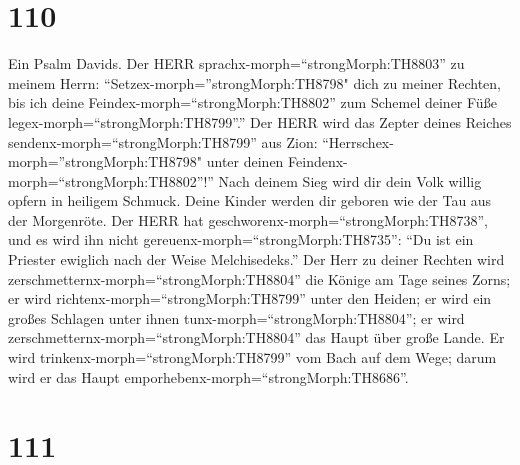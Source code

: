\hypertarget{section-109}{%
\section{110}\label{section-109}}

 Ein Psalm Davids. Der HERR
sprachx-morph=``strongMorph:TH8803'' zu meinem Herrn:
``Setzex-morph=''strongMorph:TH8798" dich zu meiner Rechten, bis ich
deine Feindex-morph=``strongMorph:TH8802'' zum Schemel deiner Füße
legex-morph=``strongMorph:TH8799''.''  Der HERR wird das
Zepter deines Reiches sendenx-morph=``strongMorph:TH8799'' aus Zion:
``Herrschex-morph=''strongMorph:TH8798" unter deinen
Feindenx-morph=``strongMorph:TH8802''!''  Nach deinem Sieg
wird dir dein Volk willig opfern in heiligem Schmuck. Deine Kinder
werden dir geboren wie der Tau aus der Morgenröte.  Der HERR
hat geschworenx-morph=``strongMorph:TH8738'', und es wird ihn nicht
gereuenx-morph=``strongMorph:TH8735'': ``Du ist ein Priester ewiglich
nach der Weise Melchisedeks.''  Der Herr zu deiner Rechten
wird zerschmetternx-morph=``strongMorph:TH8804'' die Könige am Tage
seines Zorns;  er wird richtenx-morph=``strongMorph:TH8799''
unter den Heiden; er wird ein großes Schlagen unter ihnen
tunx-morph=``strongMorph:TH8804''; er wird
zerschmetternx-morph=``strongMorph:TH8804'' das Haupt über große Lande.
 Er wird trinkenx-morph=``strongMorph:TH8799'' vom Bach auf
dem Wege; darum wird er das Haupt
emporhebenx-morph=``strongMorph:TH8686''.

\hypertarget{section-110}{%
\section{111}\label{section-110}}

